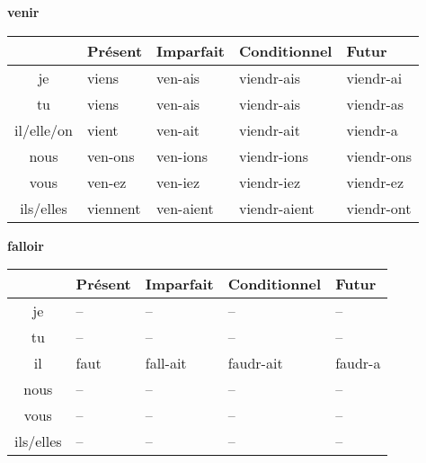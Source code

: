 \renewcommand{\stemPresent}{ven}
\renewcommand{\stemFutur}{viendr}
\begin{center}
\textbf{venir}
\vskip 0.1cm
\begin{tabular}{|c||L{3cm}|L{3cm}|L{3cm}|L{3cm}|}
\hline
& Pr\'esent & Imparfait & Conditionnel & Futur \\
\hline\hline
je           &	viens 	&	\stemPresent-ais	&	\stemFutur-ais	 &	\stemFutur-ai	\\
tu           &	viens		&	\stemPresent-ais	&	\stemFutur-ais	&	\stemFutur-as	\\
il/elle/on &	vient		&	\stemPresent-ait	&	\stemFutur-ait	&	\stemFutur-a	\\
nous      &	\stemPresent-ons	&	\stemPresent-ions	&	\stemFutur-ions	&	\stemFutur-ons	\\
vous      &	\stemPresent-ez	&	\stemPresent-iez	&	\stemFutur-iez		&	\stemFutur-ez	\\
ils/elles  &	viennent	&	\stemPresent-aient	&	\stemFutur-aient	&	\stemFutur-ont	\\
\hline
\end{tabular}
\end{center}

\renewcommand{\stemPresent}{fall}
\renewcommand{\stemFutur}{faudr}
\begin{center}
\textbf{falloir}
\vskip 0.1cm
\begin{tabular}{|c||L{3cm}|L{3cm}|L{3cm}|L{3cm}|}
\hline
& Pr\'esent & Imparfait & Conditionnel & Futur \\
\hline\hline
je           &	-- 	&	--	&	--	 &	--	\\
tu           &	--	&	--	&	--	&	--	\\
{\color{red}il} &	faut		&	\stemPresent-ait	&	\stemFutur-ait	&	\stemFutur-a	\\
nous      &	--	&	--	&	--	&	--	\\
vous      &	--	&	--	&	--	&	--	\\
ils/elles  &	--	&	--	&	--	&	--	\\
\hline
\end{tabular}
\end{center}


\clearpage

